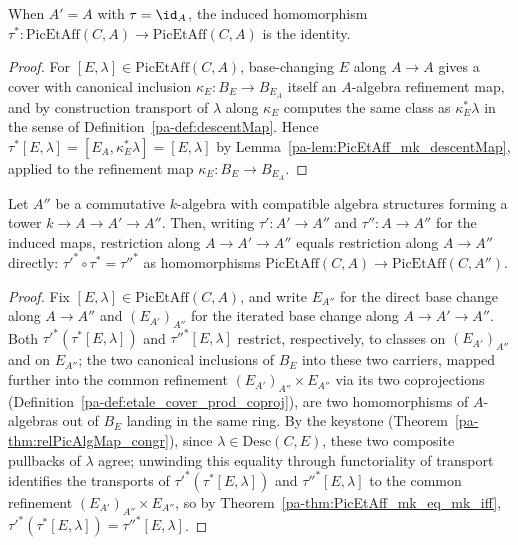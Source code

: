 \begin{theorem}
  \label{pa-thm:PicEtAff_map_id}
  \leanok

  When \(A' = A\) with \(\tau = \id_A\), the induced homomorphism \(\tau^{*} \colon
  \mathrm{PicEtAff}(C,A) \to \mathrm{PicEtAff}(C,A)\) is the identity.
\end{theorem}
\begin{proof}
  \leanok
  For \([E,\lambda] \in \mathrm{PicEtAff}(C,A)\), base-changing \(E\) along \(A \to A\) gives a
  cover with canonical inclusion \(\kappa_E \colon B_E \to B_{E_A}\) itself an \(A\)-algebra
  refinement map, and by construction transport of \(\lambda\) along \(\kappa_E\) computes the
  same class as \(\kappa_E^{*}\lambda\) in the sense of Definition~\ref{pa-def:descentMap}. Hence
  \(\tau^{*}[E,\lambda] = [E_A, \kappa_E^{*}\lambda] = [E,\lambda]\) by
  Lemma~\ref{pa-lem:PicEtAff_mk_descentMap}, applied to the refinement map \(\kappa_E \colon B_E
  \to B_{E_A}\).
\end{proof}

\begin{theorem}
  \label{pa-thm:PicEtAff_map_map}
  \leanok

  Let \(A''\) be a commutative \(k\)-algebra with compatible algebra structures forming a tower
  \(k \to A \to A' \to A''\). Then, writing \(\tau' \colon A' \to A''\) and \(\tau'' \colon A
  \to A''\) for the induced maps, restriction along \(A \to A' \to A''\) equals restriction
  along \(A \to A''\) directly:
  \(\tau'^{*} \circ \tau^{*} = \tau''^{*}\) as homomorphisms \(\mathrm{PicEtAff}(C,A) \to
  \mathrm{PicEtAff}(C,A'')\).
\end{theorem}
\begin{proof}
  \leanok
  Fix \([E,\lambda] \in \mathrm{PicEtAff}(C,A)\), and write \(E_{A''}\) for the direct base
  change along \(A \to A''\) and \((E_{A'})_{A''}\) for the iterated base change along
  \(A \to A' \to A''\). Both \(\tau'^{*}(\tau^{*}[E,\lambda])\) and \(\tau''^{*}[E,\lambda]\)
  restrict, respectively, to classes on \((E_{A'})_{A''}\) and on \(E_{A''}\); the two
  canonical inclusions of \(B_E\) into these two carriers, mapped further into the common
  refinement \((E_{A'})_{A''} \times E_{A''}\) via its two coprojections
  (Definition~\ref{pa-def:etale_cover_prod_coproj}), are two homomorphisms of \(A\)-algebras out
  of \(B_E\) landing in the same ring. By the keystone (Theorem~\ref{pa-thm:relPicAlgMap_congr}),
  since \(\lambda \in \mathrm{Desc}(C,E)\), these two composite pullbacks of \(\lambda\) agree;
  unwinding this equality through functoriality of transport identifies the transports of
  \(\tau'^{*}(\tau^{*}[E,\lambda])\) and \(\tau''^{*}[E,\lambda]\) to the common refinement
  \((E_{A'})_{A''} \times E_{A''}\), so by Theorem~\ref{pa-thm:PicEtAff_mk_eq_mk_iff},
  \(\tau'^{*}(\tau^{*}[E,\lambda]) = \tau''^{*}[E,\lambda]\).
\end{proof}

